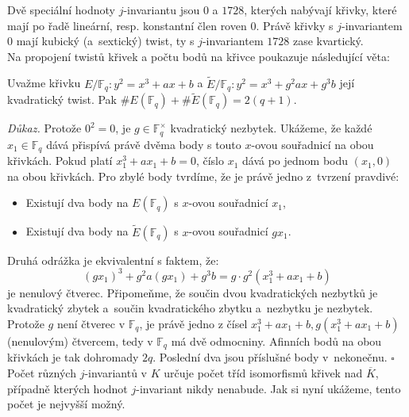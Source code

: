 \documentclass [12pt]{report}
\begin{document}
Dvě speciální hodnoty $j$-invariantu jsou $0$ a $1728$, kterých nabývají křivky, které mají po řadě lineární, resp. konstantní člen roven $0$. Právě křivky s $j$-invariantem $0$ mají kubický (a~sextický) twist, ty s $j$-invariantem $1728$ zase kvartický.\\

Na propojení twistů křivek a počtu bodů na křivce poukazuje následující věta:

\begin{veta}\label{twister}
Uvažme křivku $E/\mathbb{F}_q : y^2 = x^3+ax+b$ a  $ \tilde{E}/\mathbb{F}_q : y^2 = x^3 + g^2 ax + g^3 b $ její kvadratický twist. Pak $\#E(\mathbb{F}_q) + \# \tilde{E}(\mathbb{F}_q) = 2(q+1)$.
\end{veta}
\noindent \textit{Důkaz.} Protože $0^2= 0$, je $g \in \mathbb{F}^\times_q$ kvadratický nezbytek. Ukážeme, že každé $x_1 \in \mathbb{F}_q$ dává přispívá právě dvěma body s touto $x$-ovou souřadnicí na obou křivkách. Pokud platí $x_1^3 + ax_1 + b = 0$, číslo $x_1$ dává po jednom bodu $(x_1,0)$ na obou křivkách. Pro zbylé body tvrdíme, že je právě jedno z~tvrzení pravdivé: 
\begin{itemize}
\item Existují dva body na $E(\mathbb{F}_q)$ s $x$-ovou souřadnicí $x_1$,
\item Existují dva body na $\tilde{E}(\mathbb{F}_q)$ s $x$-ovou souřadnicí $gx_1$.
\end{itemize}
Druhá odrážka je ekvivalentní s faktem, že: 
\begin{equation*}
(gx_1)^3 + g^2 a (gx_1) + g^3 b = g \cdot g^2 (x_1^3+ax_1+b)
\end{equation*}
je nenulový čtverec. Připomeňme, že součin dvou kvadratických nezbytků je kvadratický zbytek a~součin kvadratického zbytku a~nezbytku je nezbytek. Protože $g$ není čtverec v $\mathbb{F}_q$, je právě jedno z čísel $x_1 ^3 + ax_1 + b, g(x_1 ^3 + ax_1 + b)$ (nenulovým) čtvercem, tedy v $\mathbb{F}_q$ má dvě odmocniny. Afinních bodů na obou křivkách je tak dohromady $2q$. Poslední dva jsou příslušné body v~nekonečnu. \hfill $\square$\\

Počet různých $j$-invariantů v $K$ určuje počet tříd isomorfismů křivek nad $\overline{K}$, případně kterých hodnot $j$-invariant nikdy nenabude. Jak si nyní ukážeme, tento počet je nejvyšší možný.
\end{document}
